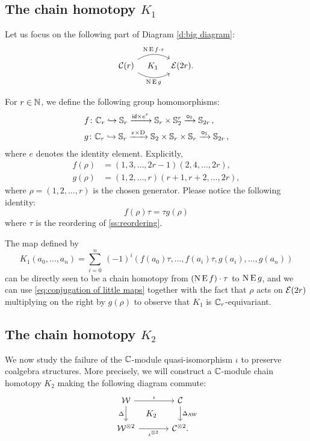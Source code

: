 \subsection{The chain homotopy $K_1$}

Let us focus on the following part of Diagram \eqref{d:big diagram}:
\[
\begin{tikzcd}[column sep=large]
	\cC(r)
	\arrow[r,bend left,"\chains\EE f \cdot \tau"]
	\arrow[r,bend right,"\chains\EE g"']
	\arrow[r,phantom,"K_1"]
	& \BE(2r).
\end{tikzcd}
\]

For $r \in \mathbb{N}$, we define the following group homomorphisms:
\[
\begin{split}
	&f \colon \mathbb{C}_r \hookrightarrow \mathbb{S}_r \xrightarrow{\mathsf{id} \times e^r} \mathbb{S}_r \times \mathbb{S}_2^r \xrightarrow{\bm{\circ}_{\mathbb{S}}} \mathbb{S}_{2r}\,, \\
	&g \colon \mathbb{C}_r \hookrightarrow \mathbb{S}_r \xrightarrow{e \times \mathrm{D}} \mathbb{S}_2 \times \mathbb{S}_r \times \mathbb{S}_r \xrightarrow{\bm{\circ}_{\mathbb{S}}} \mathbb{S}_{2r}\,,
\end{split}
\]
where $e$ denotes the identity element.
Explicitly,
\begin{align*}
	f(\rho) &= (1,3,\dots,2r-1)(2,4,\dots,2r), \\
	g(\rho) &= (1,2,\dots,r)(r+1,r+2,\dots,2r),
\end{align*}
where $\rho = (1,2,\dots,r)$ is the chosen generator.
Please notice the following identity:
\begin{equation}\label{eq:conjugation of little maps}
	f(\rho) \tau = \tau g(\rho)
\end{equation}
where $\tau$ is the reordering of \cref{ss:reordering}.

The map defined by
\[
K_1(a_0,\dots,a_n) =
\sum_{i=0}^n \ (-1)^i (f(a_0) \tau, \dots, f(a_i) \tau, g(a_i), \dots, g(a_n))
\]
can be directly seen to be a chain homotopy from $(\operatorname{N} \operatorname{E} f) \cdot \tau$ to $\operatorname{N} \operatorname{E} g$, and we can use \cref{eq:conjugation of little maps} together with the fact that $\rho$ acts on $\mathcal{E}(2r)$ multiplying on the right by $g(\rho)$ to observe that $K_1$ is $\mathbb{C}_r$-equivariant.

\subsection{The chain homotopy $K_2$} \label{ss:coproduct}

We now study the failure of the $\mathbb{C}$-module quasi-isomorphism $\iota$ to preserve coalgebra structures.
More precisely, we will construct a $\mathbb{C}$-module chain homotopy $K_2$ making the following diagram commute:
\begin{equation}\label{d:coproducts}
	\begin{tikzcd}[column sep=large]
			\cW \arrow[r,"\iota"] \arrow[d,"\Delta"'] \arrow[dr,phantom,"K_2"]&
			\cC \arrow[d,"\Delta_{\AW}"] \\
			\cW^{\ot 2} \arrow[r,"\iota^{\ot 2}"'] &
			\cC^{\ot 2}.
		\end{tikzcd}
\end{equation}

